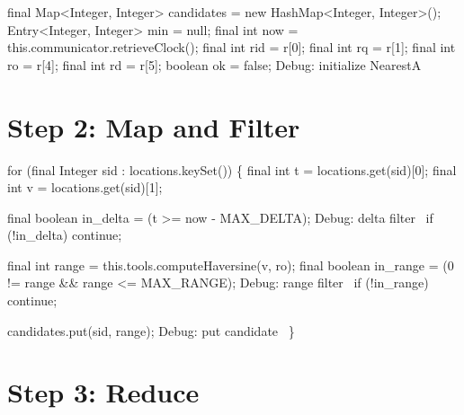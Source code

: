 \nwenddocs{}\endmoddef\nwstartdeflinemarkup{}\nwenddeflinemarkup
final Map<Integer, Integer> candidates = new HashMap<Integer, Integer>();
Entry<Integer, Integer> min = null;
final int now = this.communicator.retrieveClock();
final int rid = r[0];
final int rq  = r[1];
final int ro  = r[4];
final int rd  = r[5];
boolean ok = false;
\LA{}Debug: initialize NearestA~{\nwtagstyle{}}\RA{}
\nwendcode{}\nwdocspar

\section{Step 2: Map and Filter}

\nwenddocs{}\endmoddef\nwstartdeflinemarkup{}\nwenddeflinemarkup
for (final Integer sid : locations.keySet()) \{
  final int t = locations.get(sid)[0];
  final int v = locations.get(sid)[1];

  final boolean in_delta = (t >= now - MAX_DELTA);
  \LA{}Debug: delta filter~{\nwtagstyle{}}\RA{}
  if (!in_delta)
    continue;

  final int range = this.tools.computeHaversine(v, ro);
  final boolean in_range = (0 != range && range <= MAX_RANGE);
  \LA{}Debug: range filter~{\nwtagstyle{}}\RA{}
  if (!in_range)
    continue;

  candidates.put(sid, range);
  \LA{}Debug: put candidate~{\nwtagstyle{}}\RA{}
\}
\nwendcode{}\nwdocspar

\section{Step 3: Reduce}


